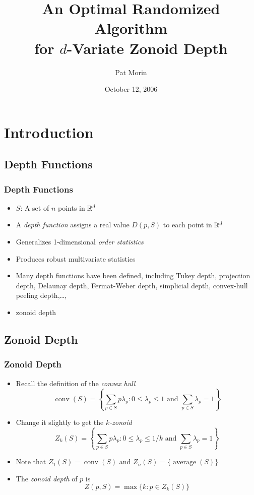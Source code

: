 \documentclass{beamer}
\title{An Optimal Randomized Algorithm \\ 
	for $d$-Variate Zonoid Depth}
\author{Pat Morin}
\institute{Carleton University}
\date{October 12, 2006}
\DeclareMathOperator{\conv}{conv}
\DeclareMathOperator{\average}{average}
\begin{document}
\frame{\titlepage}

\section[Outline]{}
\frame{\tableofcontents}

\section{Introduction}
\subsection{Depth Functions}
\frame
{
  \frametitle{Depth Functions}
  \begin{itemize}
  \item $S$: A set of $n$ points in $\mathbb{R}^d$
  \item A \emph{depth function} assigns a real value $D(p,S)$ to 
            each point in $\mathbb{R}^d$
  \item Generalizes 1-dimensional \emph{order statistics} 
  \item Produces robust multivariate statistics
  \item Many depth functions have been defined, including Tukey depth,
projection depth, Delaunay depth, Fermat-Weber depth, simplicial
depth, convex-hull peeling depth,\ldots,
  \item<1->zonoid depth
  \end{itemize}
}
    
\subsection{Zonoid Depth}
\frame
{
   \frametitle{Zonoid Depth}
   \begin{itemize}
   \item<1-> Recall the definition of the \emph{convex hull}
    \[ \conv(S) = \left\{\sum_{p\in S} p\lambda_p : 
         \mbox{$0\le\lambda_p\le 1$ and $\sum_{p\in S}\lambda_p = 1$} 
        \right\} 
    \]
   \item<2-> Change it slightly to get the \emph{$k$-zonoid}
    \[ Z_k(S) = \left\{\sum_{p\in S} p\lambda_p : 
         \mbox{$0\le\lambda_p\le 1/k$ and $\sum_{p\in S}\lambda_p = 1$} 
        \right\} 
    \]
   \item<3-> Note that $Z_1(S)=\conv(S)$ and $Z_n(S)=\{\average(S)\}$ 
   \item<4-> The \emph{zonoid depth} of $p$ is 
     \[ Z(p,S)=\max\{k : p\in Z_k(S)\} \]
   \end{itemize}
}
\end{document}
